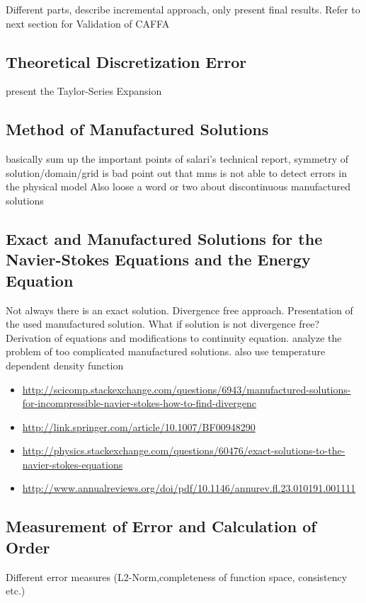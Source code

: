 \documentclass[article,type=msc,colorback,accentcolor=tud2a]{tudthesis}
\begin{document}
    Different parts, describe incremental approach, only present final results.
    Refer to next section for Validation of CAFFA

    \subsection{Theoretical Discretization Error}
      present the Taylor-Series Expansion

    \subsection{Method of Manufactured Solutions}
      basically sum up the important points of salari's technical report, symmetry of solution/domain/grid is bad
      point out that mms is not able to detect errors in the physical model
      Also loose a word or two about discontinuous manufactured solutions

    \subsection{Exact and Manufactured Solutions for the Navier-Stokes Equations and the Energy Equation}
    Not always there is an exact solution. Divergence free approach. Presentation of the used manufactured solution. What if solution is not divergence free? Derivation of equations and modifications to continuity equation. analyze the problem of too complicated manufactured solutions. also use temperature dependent density function
    \begin{itemize}
      \item \url{http://scicomp.stackexchange.com/questions/6943/manufactured-solutions-for-incompressible-navier-stokes-how-to-find-divergenc}
      \item \url{http://link.springer.com/article/10.1007/BF00948290}
      \item \url{http://physics.stackexchange.com/questions/60476/exact-solutions-to-the-navier-stokes-equations}
      \item \url{http://www.annualreviews.org/doi/pdf/10.1146/annurev.fl.23.010191.001111}
    \end{itemize}
    \subsection{Measurement of Error and Calculation of Order}
      Different error measures (L2-Norm,completeness of function space, consistency etc.)
\end{document}
